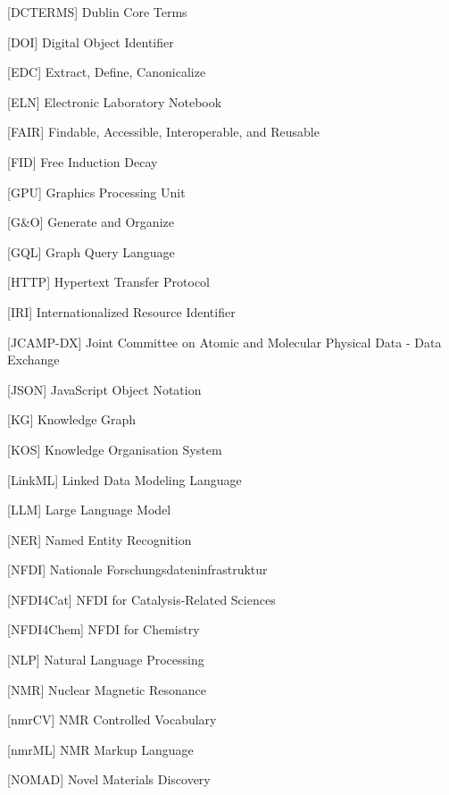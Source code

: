 \begin{singlespace}
\begin{acronym}[\rule{\abbreviationlabelwidth}{0pt}]
    [DCTERMS]
        {Dublin Core Terms}

    [DOI]
        {Digital Object Identifier}

    [EDC]
        {Extract, Define, Canonicalize}

    [ELN]
        {Electronic Laboratory Notebook}

    [FAIR]
        {Findable, Accessible, Interoperable, and Reusable}

    [FID]
        {Free Induction Decay}

    [GPU]
        {Graphics Processing Unit}

    [G\&O]
        {Generate and Organize}

    [GQL]
        {Graph Query Language}

    [HTTP]
        {Hypertext Transfer Protocol}

    [IRI]
        {Internationalized Resource Identifier}

    [JCAMP-DX]
        {Joint Committee on Atomic and Molecular Physical Data - Data Exchange}

    [JSON]
        {JavaScript Object Notation}

    [KG]
        {Knowledge Graph}

    [KOS]
        {Knowledge Organisation System}

    [LinkML]
        {Linked Data Modeling Language}

    [LLM]
        {Large Language Model}

    [NER]
        {Named Entity Recognition}

    [NFDI]
        {Nationale Forschungsdateninfrastruktur}

    [NFDI4Cat]
        {NFDI for Catalysis-Related Sciences}

    [NFDI4Chem]
        {NFDI for Chemistry}

    [NLP]
        {Natural Language Processing}

    [NMR]
        {Nuclear Magnetic Resonance}

    [nmrCV]
        {NMR Controlled Vocabulary}

    [nmrML]
        {NMR Markup Language}

    [NOMAD]
        {Novel Materials Discovery}
    

\end{acronym}
\end{singlespace}
